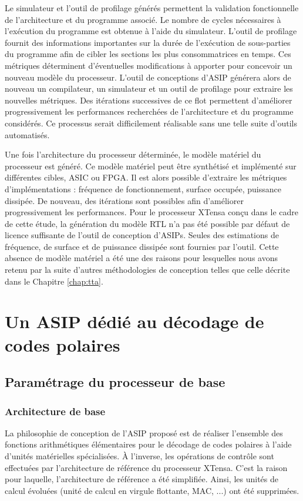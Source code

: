 Le simulateur et l'outil de profilage générés permettent la validation fonctionnelle de l'architecture et du programme associé. Le nombre de cycles nécessaires à l'exécution du programme est obtenue à l'aide du simulateur. L'outil de profilage fournit des informations importantes sur la durée de l'exécution de sous-parties du programme afin de cibler les sections les plus consommatrices en temps. Ces métriques déterminent d'éventuelles modifications à apporter pour concevoir un nouveau modèle du processeur. L'outil de conceptions d'ASIP générera alors de nouveau un compilateur, un simulateur et un outil de profilage pour extraire les nouvelles métriques. Des itérations successives de ce flot permettent d'améliorer progressivement les performances recherchées de l'architecture et du programme considérés. Ce processus serait difficilement réalisable sans une telle suite d'outils automatisés.

Une fois l'architecture du processeur déterminée, le modèle matériel du processeur est généré. Ce modèle matériel peut être synthétisé et implémenté sur différentes cibles, ASIC ou FPGA. Il est alors possible d'extraire les métriques d'implémentations : fréquence de fonctionnement, surface occupée, puissance dissipée. De nouveau, des itérations sont possibles afin d'améliorer progressivement les performances.
Pour le processeur XTensa conçu dans le cadre de cette étude, la génération du modèle RTL n'a pas été possible par défaut de licence suffisante de l'outil de conception d'ASIPs. Seules des estimations de fréquence, de surface et de puissance dissipée sont fournies par l'outil. Cette absence de modèle matériel a été une des raisons pour lesquelles nous avons retenu par la suite d'autres méthodologies de conception telles que celle décrite dans le Chapitre \ref{chap:tta}.

\section{Un ASIP dédié au décodage de codes polaires}
\label{sec:tensilica_design}
\subsection{Paramétrage du processeur de base}
\subsubsection{Architecture de base}
La philosophie de conception de l'ASIP proposé est de réaliser l'ensemble des fonctions arithmétiques élémentaires pour le décodage de codes polaires à l'aide d'unités matérielles spécialisées. \`A l'inverse, les opérations de contrôle sont effectuées par l'architecture de référence du processeur XTensa. C'est la raison pour laquelle, l'architecture de référence a été simplifiée. Ainsi, les unités de calcul évoluées (unité de calcul en virgule flottante, MAC, ...) ont été supprimées.


